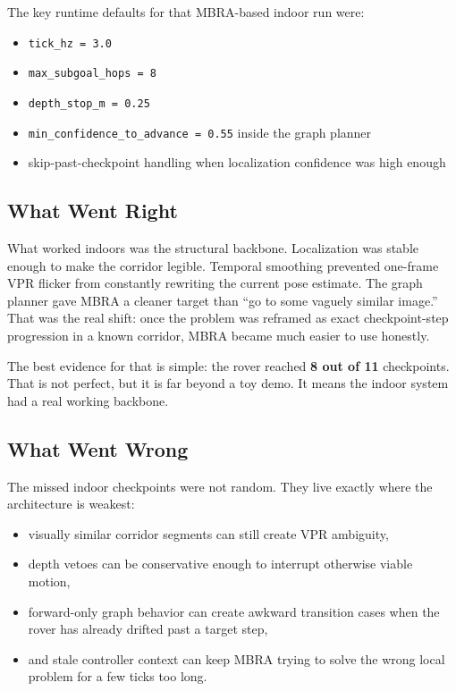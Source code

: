 \documentclass[11pt]{article}
\begin{document}
The key runtime defaults for that MBRA-based indoor run were:

\begin{itemize}[nosep]
  \item \texttt{tick\_hz = 3.0}
  \item \texttt{max\_subgoal\_hops = 8}
  \item \texttt{depth\_stop\_m = 0.25}
  \item \texttt{min\_confidence\_to\_advance = 0.55} inside the graph planner
  \item skip-past-checkpoint handling when localization confidence was high enough
\end{itemize}

\subsection{What Went Right}

What worked indoors was the structural backbone. Localization was stable enough to
make the corridor legible. Temporal smoothing prevented one-frame VPR flicker from
constantly rewriting the current pose estimate. The graph planner gave MBRA a
cleaner target than ``go to some vaguely similar image.'' That was the real shift:
once the problem was reframed as exact checkpoint-step progression in a known
corridor, MBRA became much easier to use honestly.

The best evidence for that is simple: the rover reached \textbf{8 out of 11}
checkpoints. That is not perfect, but it is far beyond a toy demo. It means the
indoor system had a real working backbone.

\subsection{What Went Wrong}

The missed indoor checkpoints were not random. They live exactly where the
architecture is weakest:

\begin{itemize}[nosep]
  \item visually similar corridor segments can still create VPR ambiguity,
  \item depth vetoes can be conservative enough to interrupt otherwise viable motion,
  \item forward-only graph behavior can create awkward transition cases when the
  rover has already drifted past a target step,
  \item and stale controller context can keep MBRA trying to solve the wrong local
  problem for a few ticks too long.
\end{itemize}
\end{document}
